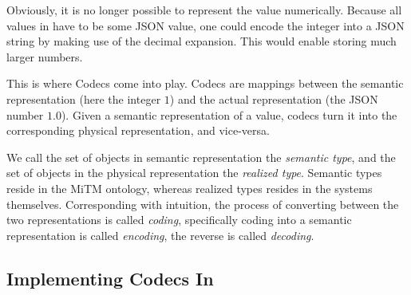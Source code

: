 Obviously, it is no longer possible to represent the value numerically. 
Because all values in \lmfdb have to be some JSON value, one could encode the integer into a JSON string by making use of the decimal expansion. 
This would enable storing much larger numbers. 

This is where Codecs come into play. 
Codecs are mappings between the semantic representation (here the integer $1$) and the actual representation (the JSON number $1.0$). 
Given a semantic representation of a value, codecs turn it into the corresponding physical representation, and vice-versa. 

We call the set of objects in semantic representation the \textit{semantic type}, and the set of objects in the physical representation the \textit{realized type}. 
Semantic types reside in the MiTM ontology, whereas realized types resides in the systems themselves. 
Corresponding with intuition, the process of converting between the two representations is called \textit{coding}, specifically coding into a semantic representation is called \textit{encoding}, the reverse is called \textit{decoding}. 

\subsection{Implementing Codecs In \mmt}\label{sec:vt:mmt}

